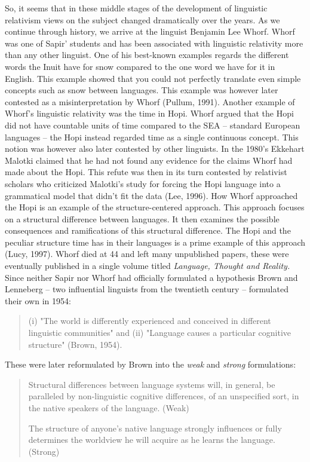 So, it seems that in these middle stages of the development of linguistic relativism views on the subject changed dramatically over the years. As we continue through history, we arrive at the linguist Benjamin Lee Whorf. Whorf was one of Sapir’ students and has been associated with linguistic relativity more than any other linguist. One of his best-known examples regards the different words the Inuit have for snow compared to the one word we have for it in English. This example showed that you could not perfectly translate even simple concepts such as snow between languages. This example was however later contested as a misinterpretation by Whorf (Pullum, 1991). Another example of Whorf’s linguistic relativity was the time in Hopi. Whorf argued that the Hopi did not have countable units of time compared to the SEA – standard European languages – the Hopi instead regarded time as a single continuous concept. This notion was however also later contested by other linguists. In the 1980’s Ekkehart Malotki claimed that he had not found any evidence for the claims Whorf had made about the Hopi. This refute was then in its turn contested by relativist scholars who criticized Malotki’s study for forcing the Hopi language into a grammatical model that didn’t fit the data (Lee, 1996). How Whorf approached the Hopi is an example of the structure-centered approach. This approach focuses on a structural difference between languages. It then examines the possible consequences and ramifications of this structural difference. The Hopi and the peculiar structure time has in their languages is a prime example of this approach (Lucy, 1997).  Whorf died at 44 and left many unpublished papers, these were eventually published in a single volume titled \textit{Language, Thought and Reality.} Since neither Sapir nor Whorf had officially formulated a hypothesis Brown and Lenneberg – two influential linguists from the twentieth century – formulated their own in 1954:  

\begin{quote}
\begin{singlespace}
(i) "The world is differently experienced and conceived in different linguistic communities" and (ii) "Language causes a particular cognitive structure" (Brown, 1954).
\end{singlespace}
\end{quote}

These were later reformulated by Brown into the \textit{weak} and \textit{strong} formulations: 

\begin{quote}
\begin{singlespace}
{Structural differences between language systems will, in general, be paralleled by non-linguistic cognitive differences, of an unspecified sort, in the native speakers of the language.} (Weak) 

{The structure of anyone's native language strongly influences or fully determines the worldview he will acquire as he learns the language. (Strong)} 

\end{singlespace}

\end{quote}

